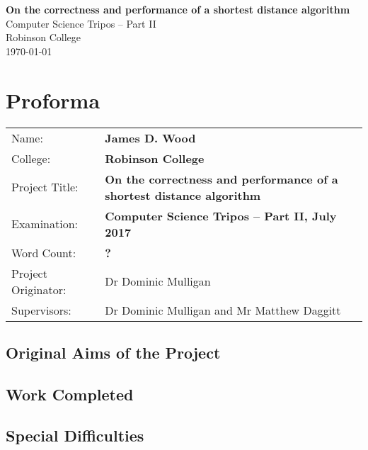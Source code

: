 \documentclass[12pt,a4paper,twoside,openright]{report}
\newcommand{\mytitle}{On the correctness and performance of a shortest distance algorithm}
\begin{document}


\pagestyle{empty}


\vspace*{60mm}
\begin{center}
\Huge
\textbf{\mytitle} \\[5mm]
Computer Science Tripos -- Part II \\[5mm]
Robinson College \\[5mm]
\today  %
\end{center}


\pagestyle{plain}

\chapter*{Proforma}

{\large
\begin{tabularx}{\linewidth}{lX}
Name:               & \bf James D. Wood \\
College:            & \bf Robinson College \\
Project Title:      & \bf \mytitle \\
Examination:        & \bf Computer Science Tripos -- Part II, July 2017  \\
Word Count:         & \bf ? \\
Project Originator: & Dr Dominic Mulligan \\
Supervisors:        & Dr Dominic Mulligan and Mr Matthew Daggitt \\
\end{tabularx}
}


\section*{Original Aims of the Project}

\section*{Work Completed}

\section*{Special Difficulties}
\end{document}
